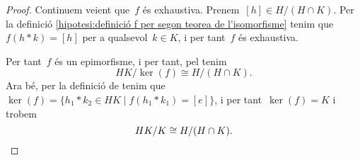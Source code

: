 \documentclass[../../main.tex]{subfiles}
\begin{document}
\begin{theorem}
\begin{proof}
            Continuem veient que~\(f\) és exhaustiva.
            Prenem~\([h]\in H/(H\cap K)\).
            Per la definició \eqref{hipotesi:definició f per segon teorea de l'isomorfisme} tenim que~\(f(h\ast k)=[h]\) per a qualsevol~\(k\in K\), i per tant~\(f\) és exhaustiva.

            Per tant~\(f\) és un epimorfisme, i per tant, pel  tenim
            \[
                HK/\ker(f)\cong H/(H\cap K).
            \]
            Ara bé, per la definició de  tenim que~\(\ker(f)=\{h_{1}\ast k_{2}\in HK\mid f(h_{1}\ast k_{1})=[e]\}\), i per tant~\(\ker(f)=K\) i trobem
            \[
                HK/K\cong H/(H\cap K).\qedhere
            \]
        \end{proof}
    \end{theorem}
\end{document}
